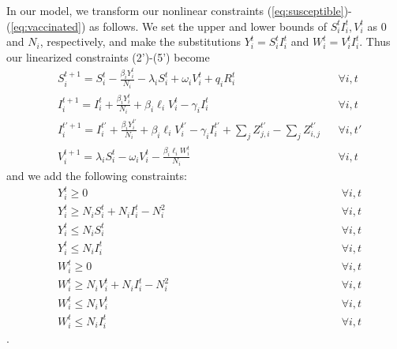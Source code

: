 \documentclass{article}
\begin{document}
In our model, we transform our nonlinear constraints (\ref{eq:susceptible})-(\ref{eq:vaccinated}) as follows. We set the upper and lower bounds of $S_i^t I_i^t, V_i^t$ as $0$ and $N_i$, respectively, and make the substitutions $ Y_i^t = S_i^t I_i^t $ and $ W_i^t = V_i^t I_i^t $. Thus our linearized constraints (2')-(5') become
\begin{align}
    &S_i^{t+1} = S_i^t - \frac{\beta_i Y_i^t}{N_i} - \lambda_i S_i^t + \omega_i V_i^t + q_i R_i^t && \forall i, t \tag{2'} \label{eq:linearized_susceptible} \\
    &I_i^{t+1} = I_i^t + \frac{\beta_i Y_i^t}{N_i} + \beta_i \ell_i V_i^t - \gamma_i I_i^t && \forall i, t \tag{3'} \label{eq:linearized_infected} \\
    &I_i^{t'+1} = I_i^{t'} + \frac{\beta_i Y_i^{t'}}{N_i} + \beta_i \ell_i V_i^{t'} - \gamma_i I_i^{t'} + \sum_j Z_{j,i}^{t'} - \sum_j Z_{i,j}^{t'} && \forall i, t' \tag{4'} \label{eq:linearized_infected_transfer} \\
    &V_i^{t+1} = \lambda_i S_i^t - \omega_i V_i^t - \frac{\beta_i \ell_i W_i^t}{N_i} && \forall i, t \tag{5'} \label{eq:linearized_vaccinated}
\end{align}
and we add the following constraints:
\begin{align}
    &Y_i^t \geq 0 && \forall i, t \tag{22} \label{eq:Y_nonnegativity} \\
    &Y_i^t \geq N_i S_i^t + N_i I_i^t - N_i^2 && \forall i, t \tag{23} \label{eq:Y_lower_bound} \\
    &Y_i^t \leq N_i S_i^t && \forall i, t \tag{24} \label{eq:Y_upper_bound_S} \\
    &Y_i^t \leq N_i I_i^t && \forall i, t \tag{25} \label{eq:Y_upper_bound_I} \\
    &W_i^t \geq 0 && \forall i, t \tag{26} \label{eq:W_nonnegativity} \\
    &W_i^t \geq N_i V_i^t + N_i I_i^t - N_i^2 \quad \quad \quad \quad \quad \quad \quad \quad \quad \quad \quad \quad \quad \quad && \forall i, t \tag{27} \label{eq:W_lower_bound} \\
    &W_i^t \leq N_i V_i^t && \forall i, t \tag{28} \label{eq:W_upper_bound_X} \\
    &W_i^t \leq N_i I_i^t && \forall i, t \tag{29} \label{eq:W_upper_bound_I}
\end{align}.
\end{document}
